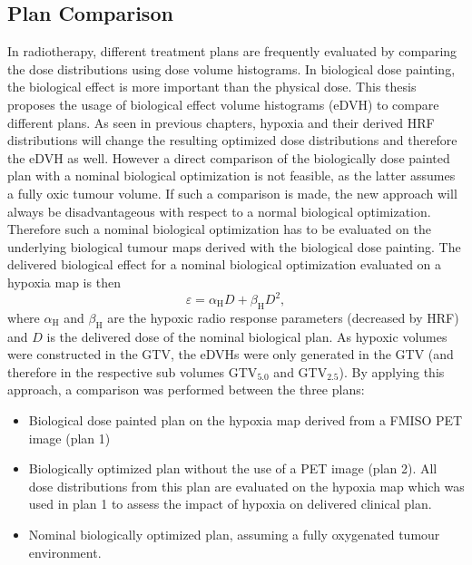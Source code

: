 \subsection{Plan Comparison}\label{chap:plancomparison}
In radiotherapy, different treatment plans are frequently evaluated by comparing the dose distributions using dose volume histograms. In biological dose painting, the biological effect is more important than the physical dose. This thesis proposes the usage of biological effect volume histograms (eDVH) to compare different plans. As seen in previous chapters, hypoxia and their derived HRF distributions will change the resulting optimized dose distributions and therefore the eDVH as well. However a direct comparison of the biologically dose painted plan with a nominal biological optimization is not feasible, as the latter assumes a fully oxic tumour volume. If such a comparison is made, the new approach will always be disadvantageous with respect to a normal biological optimization. Therefore such a nominal biological optimization has to be evaluated on the underlying biological tumour maps derived with the biological dose painting. The delivered biological effect for a nominal biological optimization evaluated on a hypoxia map is then
\begin{equation}
\varepsilon = \alpha_\mathrm{H} D + \beta_\mathrm{H}D^2,
\end{equation}
where $\alpha_\mathrm{H}$ and $\beta_\mathrm{H}$ are the hypoxic radio response parameters (decreased by HRF) and $D$ is the delivered dose of the nominal biological plan. As hypoxic volumes were constructed in the GTV, the eDVHs were only generated in the GTV (and therefore in the respective sub volumes GTV$_\mathrm{5.0}$ and GTV$_\mathrm{2.5}$). By applying this approach, a comparison was performed between the three plans:
\begin{itemize}
\item Biological dose painted plan on the hypoxia map derived from a FMISO PET image (plan 1)
\item Biologically optimized plan without the use of a PET image (plan 2). All dose distributions from this plan are evaluated on the hypoxia map which was used in plan 1 to assess the impact of hypoxia on delivered clinical plan.
\item Nominal biologically optimized plan, assuming a fully oxygenated tumour environment.
\end{itemize}